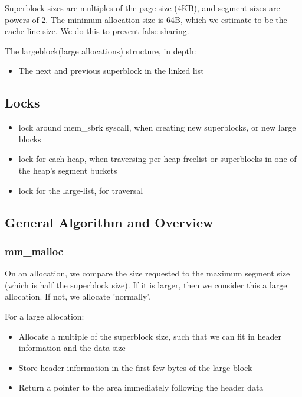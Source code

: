 \documentclass[a4paper, 12pt]{article}
\begin{document}
Superblock sizes are multiples of the page size (4KB), and segment sizes are powers of 2. The minimum allocation size is 64B, which we estimate to be the cache line size. We do this to prevent false-sharing.

The largeblock(large allocations) structure, in depth:

\begin{itemize}
	\item The next and previous superblock in the linked list
\end{itemize}

\subsection{Locks}

\begin{itemize}
	\item lock around mem\_sbrk syscall, when creating new superblocks, or new large blocks
	\item lock for each heap, when traversing per-heap freelist or superblocks in one of the heap's segment buckets
	\item lock for the large-list, for traversal
\end{itemize}

\subsection{General Algorithm and Overview}

\subsubsection{mm\_malloc}

On an allocation, we compare the size requested to the maximum segment size (which is half the superblock size). If it is larger, then we consider this a large allocation. If not, we allocate 'normally'.

For a large allocation:

\begin{itemize}
	\item Allocate a multiple of the superblock size, such that we can fit in header information and the data size
	\item Store header information in the first few bytes of the large block
	\item Return a pointer to the area immediately following the header data
\end{itemize}
\end{document}
